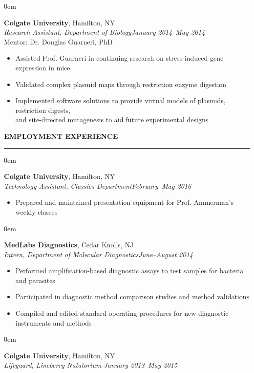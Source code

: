 \documentclass[11pt, letterpaper]{article}
\newenvironment{CVSection}{
\begin{addmargin}[2em]{0em}
\begin{samepage}}
{\end{samepage}
\end{addmargin}\bigskip}
\newcommand{\CVHeading}[1]{
\MakeUppercase{\bf #1}
\smallskip
\hrule
\medskip
}
\begin{document}
\begin{CVSection}
\textbf{Colgate University}, Hamilton, NY\\
\textsl{Research Assistant, Department of Biology\hfill January 2014--May 2014\\}
Mentor: Dr. Douglas Guarneri, PhD
\begin{itemize}
\item Assisted Prof. Guarneri in continuing research on stress-induced gene expression in mice
\item Validated complex plasmid maps through restriction enzyme digestion
\item Implemented software solutions to provide virtual models of plasmids, restriction digests, \\and site-directed mutagenesis to aid future experimental designs
\end{itemize}
\end{CVSection}

\CVHeading{Employment Experience}
\begin{CVSection}
\textbf{Colgate University}, Hamilton, NY\\
\textsl{Technology Assistant, Classics Department\hfill  February--May 2016}
\begin{itemize}
\item Prepared and maintained presentation equipment for Prof. Ammerman’s weekly classes
\end{itemize}
\end{CVSection}
\begin{CVSection}
\textbf{MedLabs Diagnostics}, Cedar Knolls, NJ\\
\textsl{Intern, Department of Molecular Diagnostics\hfill June--August 2014}
\begin{itemize}
\item Performed amplification-based diagnostic assays to test samples for bacteria and parasites
\item Participated in diagnostic method comparison studies and method validations
\item Compiled and edited standard operating procedures for new diagnostic instruments and methods
\end{itemize}
\end{CVSection}
\begin{CVSection}
\textbf{Colgate University}, Hamilton, NY\\
\textsl{Lifeguard, Lineberry Natatorium \hfill January 2013--May 2015}
\end{CVSection}
\end{document}
